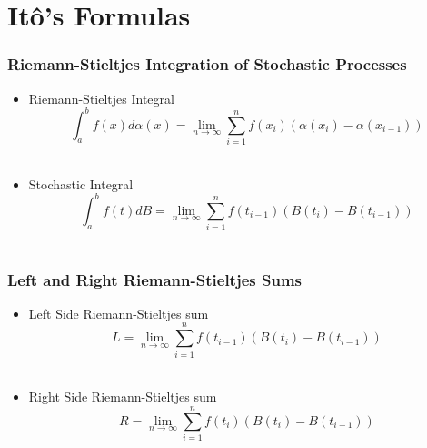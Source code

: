 \section{It\^o's Formulas}

%
%

\begin{frame}
  \frametitle{Riemann-Stieltjes Integration of Stochastic Processes}
  \begin{itemize}
  \item Riemann-Stieltjes Integral \\
    $$\int_{a}^{b} f(x) d\alpha(x)=\lim_{n\to\infty}\sum_{i=1}^{n} f(x_i) (\alpha(x_i)-\alpha(x_{i-1}))$$\\
  \item  Stochastic Integral \\
    $$\int_{a}^{b} f(t) dB=\lim_{n\to\infty}\sum_{i=1}^{n} f(t_{i-1}) (B(t_i)-B(t_{i-1}))$$\\
  \end{itemize}
\end{frame}


\begin{frame}
  \frametitle{Left and Right Riemann-Stieltjes Sums}
  \begin{itemize}
  \item Left Side Riemann-Stieltjes sum $$L=\lim_{n\to\infty}\sum_{i=1}^{n} f(t_{i-1}) (B(t_i)-B(t_{i-1}))$$\\
  \item Right Side Riemann-Stieltjes sum $$R=\lim_{n\to\infty}\sum_{i=1}^{n} f(t_i) (B(t_i)-B(t_{i-1}))$$\\

  \end{itemize}
\end{frame}
  

